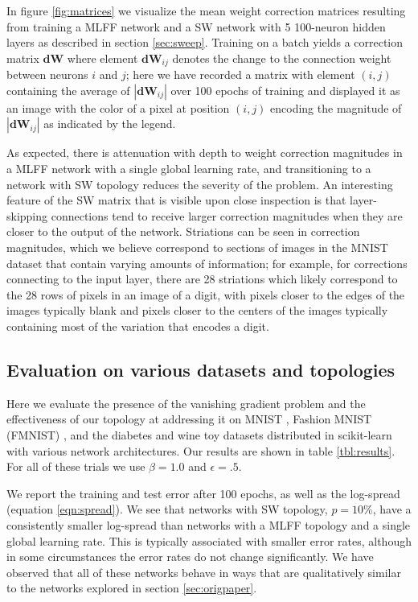 \documentclass[utf8]{frontiersSCNS}
\begin{document}
In figure \ref{fig:matrices} we visualize the mean weight correction matrices resulting from training a MLFF network and a SW network with 5 100-neuron hidden layers as described in section \ref{sec:sweep}. Training on a batch yields a correction matrix $\mathbf{dW}$ where element $\mathbf{dW}_{ij}$ denotes the change to the connection weight between neurons $i$ and $j$; here we have recorded a matrix with element $(i, j)$ containing the average of $|\mathbf{dW}_{ij}|$ over 100 epochs of training and displayed it as an image with the color of a pixel at position $(i, j)$ encoding the magnitude of $|\mathbf{dW}_{ij}|$ as indicated by the legend.

As expected, there is attenuation with depth to weight correction magnitudes in a MLFF network with a single global learning rate, and transitioning to a network with SW topology reduces the severity of the problem. An interesting feature of the SW matrix that is visible upon close inspection is that layer-skipping connections tend to receive larger correction magnitudes when they are closer to the output of the network. Striations can be seen in correction magnitudes, which we believe correspond to sections of images in the MNIST dataset that contain varying amounts of information; for example, for corrections connecting to the input layer, there are 28 striations which likely correspond to the 28 rows of pixels in an image of a digit, with pixels closer to the edges of the images typically blank and pixels closer to the centers of the images typically containing most of the variation that encodes a digit.

\subsection{Evaluation on various datasets and topologies}
\label{sec:comparison}

Here we evaluate the presence of the vanishing gradient problem and the effectiveness of our topology at addressing it on MNIST \citep{mnist1998}, Fashion MNIST (FMNIST) \citep{fmnist2017}, and the diabetes and wine toy datasets distributed in scikit-learn \citep{sklearn2011} with various network architectures. Our results are shown in table \ref{tbl:results}. For all of these trials we use $\beta=1.0$ and $\epsilon=.5$.

We report the training and test error after 100 epochs, as well as the log-spread (equation \ref{eqn:spread}). We see that networks with SW topology, $p=10\%$, have a consistently smaller log-spread than networks with a MLFF topology and a single global learning rate. This is typically associated with smaller error rates, although in some circumstances the error rates do not change significantly. We have observed that all of these networks behave in ways that are qualitatively similar to the networks explored in section \ref{sec:origpaper}.
\end{document}
